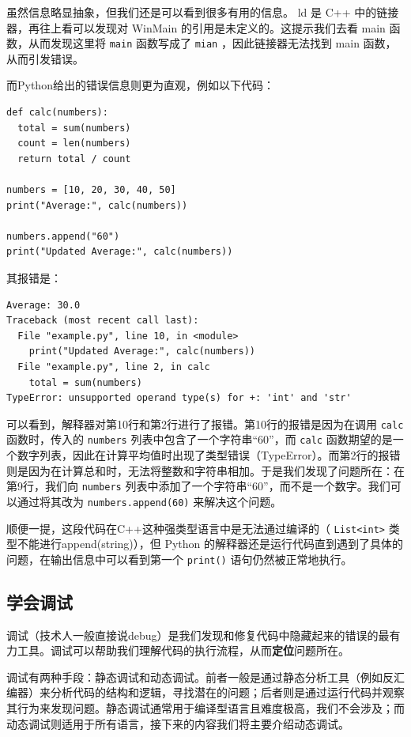 虽然信息略显抽象，但我们还是可以看到很多有用的信息。 ld 是 C++ 中的链接器，再往上看可以发现对 WinMain 的引用是未定义的。这提示我们去看 main 函数，从而发现这里将 \texttt{main} 函数写成了 \texttt{mian} ，因此链接器无法找到 main 函数，从而引发错误。

而Python给出的错误信息则更为直观，例如以下代码：

\begin{verbatim}
def calc(numbers):
  total = sum(numbers)
  count = len(numbers)
  return total / count

numbers = [10, 20, 30, 40, 50]
print("Average:", calc(numbers))

numbers.append("60")
print("Updated Average:", calc(numbers))
\end{verbatim}

其报错是：
\begin{verbatim}
Average: 30.0
Traceback (most recent call last):
  File "example.py", line 10, in <module>
    print("Updated Average:", calc(numbers))
  File "example.py", line 2, in calc
    total = sum(numbers)
TypeError: unsupported operand type(s) for +: 'int' and 'str'
\end{verbatim}

可以看到，解释器对第10行和第2行进行了报错。第10行的报错是因为在调用 \texttt{calc} 函数时，传入的 \texttt{numbers} 列表中包含了一个字符串“60”，而 \texttt{calc} 函数期望的是一个数字列表，因此在计算平均值时出现了类型错误（TypeError）。而第2行的报错则是因为在计算总和时，无法将整数和字符串相加。于是我们发现了问题所在：在第9行，我们向 \texttt{numbers} 列表中添加了一个字符串“60”，而不是一个数字。我们可以通过将其改为 \texttt{numbers.append(60)} 来解决这个问题。

顺便一提，这段代码在C++这种强类型语言中是无法通过编译的（ \texttt{List<int>} 类型不能进行append(string)），但 Python 的解释器还是运行代码直到遇到了具体的问题，在输出信息中可以看到第一个  \texttt{print()}  语句仍然被正常地执行。

\subsection{学会调试}\label{subsec:debugging}

调试（技术人一般直接说debug）是我们发现和修复代码中隐藏起来的错误的最有力工具。调试可以帮助我们理解代码的执行流程，从而\textbf{定位}问题所在。

调试有两种手段：静态调试和动态调试。前者一般是通过静态分析工具（例如反汇编器）来分析代码的结构和逻辑，寻找潜在的问题；后者则是通过运行代码并观察其行为来发现问题。静态调试通常用于编译型语言且难度极高，我们不会涉及；而动态调试则适用于所有语言，接下来的内容我们将主要介绍动态调试。

